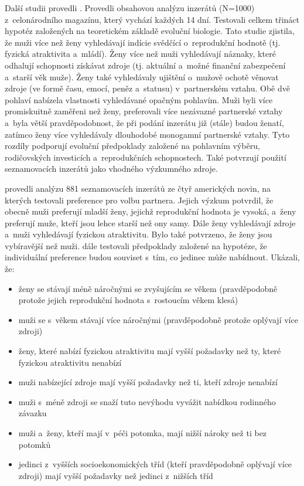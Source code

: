 \documentclass[a4paper, 12pt, notitlepage, oneside, numbers=noenddot]{report}
\begin{document}
Další studii provedli \citet{GreenlessMcGrew1994}. Provedli obsahovou
analýzu inzerátů (N=1000) z~celonárodního magazínu, který vychází
každých 14 dní. Testovali celkem třináct hypotéz založených na
teoretickém základě evoluční biologie. Tato studie zjistila, že muži
více než ženy vyhledávají indície svědčící o~reprodukční hodnotě
(tj. fyzická atraktivita a~mládí). Ženy více než muži vyhledávají
náznaky, které odhalují schopnosti získávat zdroje (tj. aktuální
a~možné finanční zabezpečení a~starší věk muže). Ženy také
vyhledávaly ujištění o~mužově ochotě věnovat zdroje (ve formě času,
emocí, peněz a~statusu) v~partnerském vztahu. Obě dvě pohlaví nabízela
vlastnosti vyhledávané opačným pohlavím. Muži byli více promiskuitně
zaměřeni než ženy, preferovali více nezávazné partnerské vztahy a~byla
větší pravděpodobnost, že při podání inzerátu již (stále) budou
ženatí, zatímco ženy více vyhledávaly dlouhodobé monogamní partnerské
vztahy. Tyto rozdíly podporují evoluční předpoklady založené na
pohlavním výběru, rodičovských investicích a~reprodukčních
schopnostech. Také potvrzují použití seznamovacích inzerátů jako
vhodného výzkumného zdroje.

\citet{WayfordDunbar1995} provedli analýzu 881 seznamovacích inzerátů
ze čtyř ame\-ric\-kých novin, na kterých testovali preference pro volbu
partnera. Jejich výzkum potvrdil, že obecně muži preferují mladší
ženy, jejichž reprodukční hodnota je vysoká, a~ženy preferují muže,
kteří jsou lehce starší než ony samy. Dále ženy vyhledávají zdroje
a~muži vyhledávají fyzickou atraktivitu. Bylo také potvrzeno, že ženy
jsou vybíravější než muži. \citet{WayfordDunbar1995} dále testovali
předpoklady založené na hypotéze, že individuální preference budou
souviset s~tím, co jedinec může nabídnout. Ukázali, že:

\begin{itemize}
\item ženy se stávají méně náročnými se zvyšujícím se věkem
  (pravděpodobně protože jejich reprodukční hodnota s~rostoucím věkem
  klesá)
\item muži se s~věkem stávají více náročnými (pravděpodobně protože
  oplývají více zdroji)
\item ženy, které nabízí fyzickou atraktivitu mají vyšší požadavky než
  ty, které fyzickou atraktivitu nenabízí
\item muži nabízející zdroje mají vyšší požadavky než ti, kteří zdroje
  nenabízí
\item muži s~méně zdroji se snaží tuto nevýhodu vyvážit nabídkou
  rodinného závazku
\item muži a~ženy, kteří mají v~péči potomka, mají nižší nároky než ti
  bez potomků
\item jedinci z~vyšších socioekonomických tříd (kteří pravděpodobně
  oplývají více zdroji) mají vyšší požadavky než jedinci z~nižších
  tříd
\end{itemize}
\end{document}
